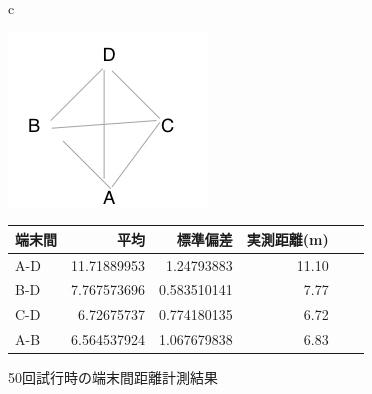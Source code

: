 \begin{figure}[p]
  \begin{center}
    \begin{tabular}{c}
      \begin{minipage}{0.3\hsize}
        \begin{center}
          \hspace{-2mm}\includegraphics[clip,width=1\hsize]{img/PC_haichi.png}
          \caption{PC配置}
          \label{fig:relpos}
        \end{center}
      \end{minipage}
      \begin{minipage}{0.68\hsize}
        \begin{center}
          \caption{50回試行時の端末間距離計測結果}
          \begin{tabular}{l|rrrrr}
            \hline
            {\footnotesize  端末間}&{\footnotesize 平均}&{\footnotesize 標準偏差}&{\footnotesize 実測距離(m) }\\
            \hline
            {\footnotesize A-D }&{\footnotesize 11.71889953}&{\footnotesize 1.24793883}&{\footnotesize 11.10 }\\
            {\footnotesize B-D }&{\footnotesize 7.767573696}&{\footnotesize 0.583510141}&{\footnotesize 7.77 }\\
            {\footnotesize C-D }&{\footnotesize 6.72675737}&{\footnotesize 0.774180135}&{\footnotesize 6.72 }\\
            {\footnotesize A-B }&{\footnotesize 6.564537924}&{\footnotesize 1.067679838}&{\footnotesize 6.83 }\\

\end{tabular}
\end{center}
\end{minipage}
\end{tabular}
\end{center}
\end{figure}
